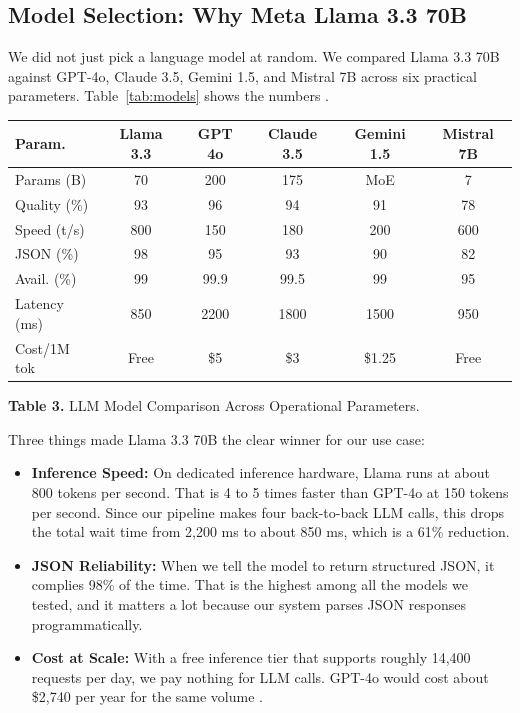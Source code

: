 \documentclass[pdflatex,sn-mathphys-num]{sn-jnl}
\theoremstyle{thmstyleone}
\theoremstyle{thmstyletwo}
\theoremstyle{thmstylethree}
\begin{document}

\subsection{Model Selection: Why Meta Llama 3.3 70B}%
\label{subsec:modelselect}

We did not just pick a language model at random.
We compared Llama 3.3 70B against GPT-4o, Claude 3.5,
Gemini 1.5, and Mistral 7B across six practical parameters.
Table~\ref{tab:models} shows the numbers \cite{b3, b7}.

\begin{table}[h]
\centering
\label{tab:llm-compare}
\renewcommand{\arraystretch}{1.15}
\begin{tabular}{|l|c|c|c|c|c|}
\hline
\textbf{Param.} & \textbf{Llama 3.3} & \textbf{GPT 4o} & \textbf{Claude 3.5} & \textbf{Gemini 1.5} & \textbf{Mistral 7B} \\
\hline
Params (B)      & 70   & 200  & 175  & MoE  & 7   \\
Quality (\%)    & 93   & 96   & 94   & 91   & 78  \\
Speed (t/s)     & 800  & 150  & 180  & 200  & 600 \\
JSON (\%)       & 98   & 95   & 93   & 90   & 82  \\
Avail. (\%)     & 99   & 99.9 & 99.5 & 99   & 95  \\
Latency (ms)    & 850  & 2200 & 1800 & 1500 & 950 \\
Cost/1M tok     & Free & \$5  & \$3  & \$1.25 & Free \\
\hline
\end{tabular}
\begin{center}
    \textbf{Table 3.} LLM Model Comparison Across Operational Parameters.
\end{center}
\end{table}

Three things made Llama 3.3 70B the clear winner for our
use case:
\begin{itemize}
    \item \textbf{Inference Speed:}
      On dedicated inference hardware, Llama runs at about
      800 tokens per second.
      That is 4 to 5 times faster than GPT-4o at 150 tokens
      per second.
      Since our pipeline makes four back-to-back LLM calls,
      this drops the total wait time from 2,200 ms to about
      850 ms, which is a 61\% reduction.

    \item \textbf{JSON Reliability:}
      When we tell the model to return structured JSON,
      it complies 98\% of the time.
      That is the highest among all the models we tested,
      and it matters a lot because our system parses JSON
      responses programmatically.

    \item \textbf{Cost at Scale:}
      With a free inference tier that supports roughly
      14,400 requests per day, we pay nothing for LLM calls.
      GPT-4o would cost about \$2,740 per year for the same
      volume \cite{b3}.
\end{itemize}
\end{document}
